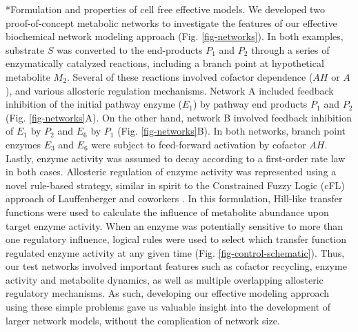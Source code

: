 \documentclass[12pt]{article}
\makeatletter
\renewcommand\subsection{\@startsection
	{subsection}{2}{0mm}
	{-0.05in}
	{-0.5\baselineskip}
	{\normalfont\normalsize\bfseries}}
\makeatother
\begin{document}
\subsection*{Formulation and properties of cell free effective models.}
We developed two proof-of-concept metabolic networks to investigate the features of our effective biochemical network modeling approach (Fig. \ref{fig-networks}).
In both examples, substrate $S$ was converted to the end-products $P_{1}$ and $P_{2}$ through a series of enzymatically catalyzed reactions, 
including a branch point at hypothetical metabolite $M_{2}$. 
Several of these reactions involved cofactor dependence ($AH$ or $A$), and various allosteric regulation mechanisms. 
Network A included feedback inhibition of the initial pathway enzyme ($E_{1}$) by pathway end products $P_{1}$ and $P_{2}$ (Fig. \ref{fig-networks}A).
On the other hand, network B involved feedback inhibition of $E_{1}$ by $P_{2}$ and $E_{6}$ by $P_{1}$ (Fig. \ref{fig-networks}B). 
In both networks, branch point enzymes $E_{3}$ and $E_{6}$ were subject to feed-forward activation by cofactor $AH$.
Lastly, enzyme activity was assumed to decay according to a first-order rate law in both cases. 
Allosteric regulation of enzyme activity was represented using a novel rule-based strategy, similar in spirit to the 
Constrained Fuzzy Logic (cFL) approach of Lauffenberger and coworkers \citep{Morris:2011aa}. 
In this formulation, Hill-like transfer functions were used to calculate the influence of metabolite abundance upon target enzyme activity. 
When an enzyme was potentially sensitive to more than one regulatory influence, logical rules were used to select which transfer function regulated enzyme 
activity at any given time (Fig. \ref{fig-control-schematic}).      
Thus, our test networks involved important features such as cofactor recycling, enzyme activity and metabolite dynamics, 
as well as multiple overlapping allosteric regulatory mechanisms.  
As such, developing our effective modeling approach using these simple problems gave us valuable insight into the development of larger network models, 
without the complication of network size. 
\end{document}
